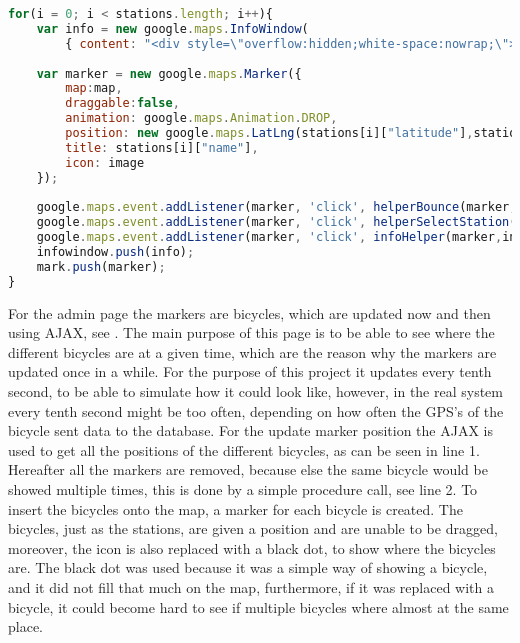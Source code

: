 \begin{minipage}{\textwidth}
\begin{lstlisting}[caption={Construction of stations}, label={lst:creationofstations}, language=Javascript]
for(i = 0; i < stations.length; i++){
	var info = new google.maps.InfoWindow(
		{ content: "<div style=\"overflow:hidden;white-space:nowrap;\"><b>" + stations[i]["name"] + "</b><br/> Available Bicycles: " + freeBicycleList[i+1] + "<br/> Available Docks: " + freeDockList[i+1] + "</div>"});
            
	var marker = new google.maps.Marker({
		map:map,
		draggable:false,
		animation: google.maps.Animation.DROP,
		position: new google.maps.LatLng(stations[i]["latitude"],stations[i]["longitude"]),
		title: stations[i]["name"],
		icon: image
	});
            
	google.maps.event.addListener(marker, 'click', helperBounce(marker,toggleBounce));
	google.maps.event.addListener(marker, 'click', helperSelectStation(SelectStationFromList, marker.title));
	google.maps.event.addListener(marker, 'click', infoHelper(marker,info,map));
	infowindow.push(info);
	mark.push(marker);
}
\end{lstlisting}
\end{minipage}

For the admin page the markers are bicycles, which are updated now and then using AJAX, see .
The main purpose of this page is to be able to see where the different bicycles are at a given time, which are the reason why the markers are updated once in a while.
For the purpose of this project it updates every tenth second, to be able to simulate how it could look like, however, in the real system every tenth second might be too often, depending on how often the GPS's of the bicycle sent data to the database.
For the update marker position the AJAX is used to get all the positions of the different bicycles, as can be seen in line 1.
Hereafter all the markers are removed, because else the same bicycle would be showed multiple times, this is done by a simple procedure call, see line 2.
To insert the bicycles onto the map, a marker for each bicycle is created.
The bicycles, just as the stations, are given a position and are unable to be dragged, moreover, the icon is also replaced with a black dot, to show where the bicycles are.
The black dot was used because it was a simple way of showing a bicycle, and it did not fill that much on the map, furthermore, if it was replaced with a bicycle, it could become hard to see if multiple bicycles where almost at the same place.

